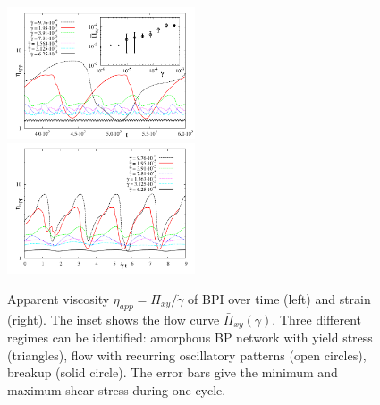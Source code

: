 \documentclass[aps,pre,reprint,superscriptaddress, twocolumn]{revtex4}
\newcommand{\gd}{\dot{\gamma}}
\begin{document}
\begin{figure}[ht]
\includegraphics[width=0.495\textwidth]{stress_bp1.pdf}
\includegraphics[width=0.495\textwidth]{stress_vs_strain_bp1.pdf}
\caption{Apparent viscosity $\eta_{app}=\Pi_{xy}/\dot{\gamma}$ of BPI over time (left) and strain (right). The inset shows the flow curve $\bar{\Pi}_{xy}(\gd)$. Three different regimes can be identified: amorphous BP network with yield stress (triangles), flow with recurring oscillatory patterns (open circles), breakup (solid circle). The error bars give the minimum and maximum shear stress during one cycle.}
\label{bp1-rheo}
\end{figure}
\end{document}
